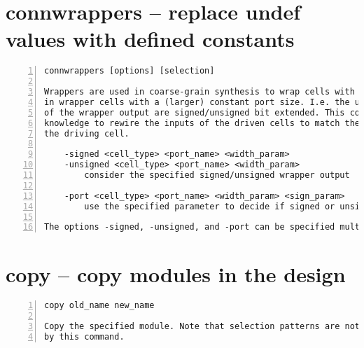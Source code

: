 \section{connwrappers -- replace undef values with defined constants}
\label{cmd:connwrappers}
\begin{lstlisting}[numbers=left,frame=single]
    connwrappers [options] [selection]

Wrappers are used in coarse-grain synthesis to wrap cells with smaller ports
in wrapper cells with a (larger) constant port size. I.e. the upper bits
of the wrapper output are signed/unsigned bit extended. This command uses this
knowledge to rewire the inputs of the driven cells to match the output of
the driving cell.

    -signed <cell_type> <port_name> <width_param>
    -unsigned <cell_type> <port_name> <width_param>
        consider the specified signed/unsigned wrapper output

    -port <cell_type> <port_name> <width_param> <sign_param>
        use the specified parameter to decide if signed or unsigned

The options -signed, -unsigned, and -port can be specified multiple times.
\end{lstlisting}

\section{copy -- copy modules in the design}
\label{cmd:copy}
\begin{lstlisting}[numbers=left,frame=single]
    copy old_name new_name

Copy the specified module. Note that selection patterns are not supported
by this command.
\end{lstlisting}

